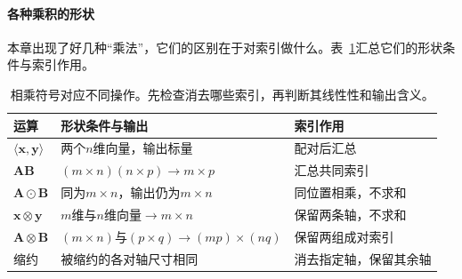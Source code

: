 \paragraph{各种乘积的形状}

本章出现了好几种“乘法”，它们的区别在于对索引做什么。表~\ref{tab:linear-algebra-products-and-shapes}汇总它们的形状条件与索引作用。

\begin{table}[htbp]
 \centering\small
 \begin{tabularx}{\linewidth}{@{}lXX@{}}
  \toprule
  运算 & 形状条件与输出 & 索引作用\\
  \midrule
  $\langle\bm x,\bm y\rangle$ & 两个$n$维向量，输出标量 & 配对后汇总\\
  $\bm A\bm B$ & $(m\times n)(n\times p)\to m\times p$ & 汇总共同索引\\
  $\bm A\odot\bm B$ & 同为$m\times n$，输出仍为$m\times n$ & 同位置相乘，不求和\\
  $\bm x\otimes\bm y$ & $m$维与$n$维向量$\to m\times n$ & 保留两条轴，不求和\\
  $\bm A\otimes\bm B$ & $(m\times n)$与$(p\times q)\to(mp)\times(nq)$ & 保留两组成对索引\\
  缩约 & 被缩约的各对轴尺寸相同 & 消去指定轴，保留其余轴\\
  \bottomrule
 \end{tabularx}
 \caption{相乘符号对应不同操作。先检查消去哪些索引，再判断其线性性和输出含义。}
 \label{tab:linear-algebra-products-and-shapes}
\end{table}
